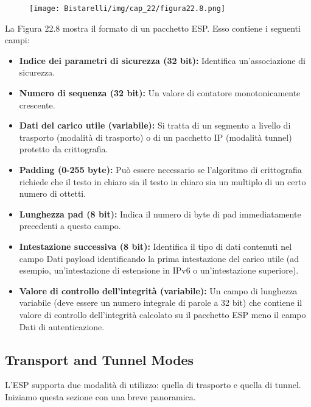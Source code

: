 \begin{figure}[H]
	\centering
    \texttt{[image: Bistarelli/img/cap\_22/figura22.8.png]}
\end{figure}

La Figura 22.8 mostra il formato di un pacchetto ESP. Esso contiene i seguenti campi:
\begin{itemize}
    \item \textbf{Indice dei parametri di sicurezza (32 bit):} Identifica un'associazione di sicurezza.
    
    \item \textbf{Numero di sequenza (32 bit):} Un valore di contatore monotonicamente crescente.
    
    \item \textbf{Dati del carico utile (variabile):} Si tratta di un segmento a livello di trasporto (modalità di trasporto) o di un pacchetto IP (modalità tunnel) protetto da crittografia.
    
    \item\textbf{Padding (0-255 byte):} Può essere necessario se l'algoritmo di crittografia richiede che il testo in chiaro sia il testo in chiaro sia un multiplo di un certo numero di ottetti.
    
    \item \textbf{Lunghezza pad (8 bit):} Indica il numero di byte di pad immediatamente precedenti a questo campo.
    
    \item \textbf{Intestazione successiva (8 bit):} Identifica il tipo di dati contenuti nel campo Dati payload identificando la prima intestazione del carico utile (ad esempio, un'intestazione di estensione in IPv6 o un'intestazione superiore).
    
    \item \textbf{Valore di controllo dell'integrità (variabile):} Un campo di lunghezza variabile (deve essere un numero integrale di parole a 32 bit) che contiene il valore di controllo dell'integrità calcolato su il pacchetto ESP meno il campo Dati di autenticazione.
\end{itemize}
\subsection{Transport and Tunnel Modes}
L'ESP supporta due modalità di utilizzo: quella di trasporto e quella di tunnel. Iniziamo questa sezione con una breve panoramica.

